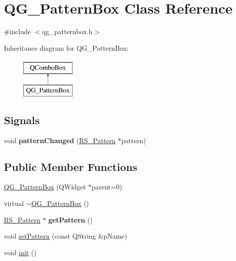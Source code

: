 \hypertarget{classQG__PatternBox}{\section{Q\-G\-\_\-\-Pattern\-Box Class Reference}
\label{classQG__PatternBox}
}


{\ttfamily \#include $<$qg\-\_\-patternbox.\-h$>$}

Inheritance diagram for Q\-G\-\_\-\-Pattern\-Box\-:\begin{figure}[H]
\begin{center}
\leavevmode
\includegraphics[height=2.000000cm]{classQG__PatternBox}
\end{center}
\end{figure}
\subsection*{Signals}
\begin{DoxyCompactItemize}
\item 
\hypertarget{classQG__PatternBox_a989fcbcda71115ab3861066b2dd31c02}{void {\bfseries pattern\-Changed} (\hyperlink{classRS__Pattern}{R\-S\-\_\-\-Pattern} $\ast$pattern)}\label{classQG__PatternBox_a989fcbcda71115ab3861066b2dd31c02}

\end{DoxyCompactItemize}
\subsection*{Public Member Functions}
\begin{DoxyCompactItemize}
\item 
\hyperlink{classQG__PatternBox_ad4ee7a4974990094e657c26afa8ef7cc}{Q\-G\-\_\-\-Pattern\-Box} (Q\-Widget $\ast$parent=0)
\item 
virtual \hyperlink{classQG__PatternBox_af28b4c2474484b2c6d49a7ad616dfe55}{$\sim$\-Q\-G\-\_\-\-Pattern\-Box} ()
\item 
\hypertarget{classQG__PatternBox_a65450731c97e09d441b469d5e4ff5eb7}{\hyperlink{classRS__Pattern}{R\-S\-\_\-\-Pattern} $\ast$ {\bfseries get\-Pattern} ()}\label{classQG__PatternBox_a65450731c97e09d441b469d5e4ff5eb7}

\item 
void \hyperlink{classQG__PatternBox_a242b243f679bbd5750b580b9988fa496}{set\-Pattern} (const Q\-String \&p\-Name)
\item 
void \hyperlink{classQG__PatternBox_a68f7b38f3dea2093dc2a43598f0a40c4}{init} ()
\end{DoxyCompactItemize}


